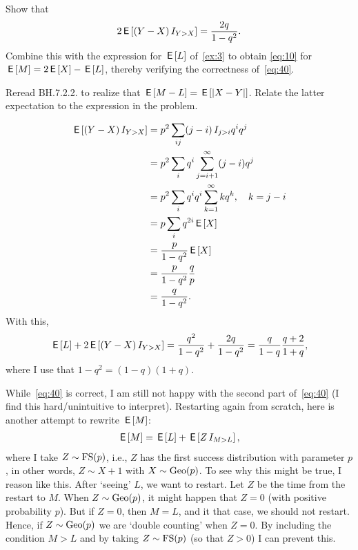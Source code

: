\documentclass[a4paper,11pt]{article}
\begin{document}
\begin{exercise}\label{ex:9}
Show that 
\begin{equation}
  \label{eq:41}
2\,\mathsf{E}\left[(Y-X) \,I_{Y>X}\right] = \frac{2q} {1-q^{2}}.
\end{equation}
Combine this with the expression for $\,\mathsf{E}\left[L\right]$ of~\cref{ex:3} to obtain \cref{eq:10} for $\,\mathsf{E}\left[M\right] = 2\,\mathsf{E}\left[X\right] - \,\mathsf{E}\left[L\right]$, thereby verifying the correctness of~\cref{eq:40}. 
\begin{hint}
  Reread BH.7.2.2. to realize that $\,\mathsf{E}\left[M-L\right] = \,\mathsf{E}\left[|X-Y|\right]$. Relate the latter expectation to the expression in the problem. 
\end{hint}
\begin{solution}
  \begin{align}
    \label{eq:42}
\,\mathsf{E}\left[(Y-X) \,I_{Y>X}\right] 
&= p^2\sum_{ij} (j-i)\,I_{j>i} q^iq^j\\
&= p^2\sum_{i} q^i\sum_{j=i+1}^{\infty}(j-i)q^j\\
&= p^2\sum_{i} q^i q^{i}\sum_{k=1}^{\infty}kq^k, \quad k = j-i\\
&= p\sum_{i}  q^{2i}\,\mathsf{E}\left[X\right] \\
&= \frac{p}{1-q^{2}}\,\mathsf{E}\left[X\right] \\
&= \frac{p}{1-q^{2}}\frac q p \\
&= \frac{q}{1-q^{2}}.
  \end{align}
With this, 
\begin{align}
  \label{eq:43}
\,\mathsf{E}\left[L\right] + 2  \,\mathsf{E}\left[(Y-X) \,I_{Y>X}\right] = \frac{q^{2}}{1-q^2} +  \frac{2q}{1-q^{2}} = \frac q{1-q}\frac{q+2}{1+q},
\end{align}
where I use that $1-q^{2}=(1-q)(1+q)$.
\end{solution}
\end{exercise}

While~\cref{eq:40} is correct, I am still not happy with the second part of~\eqref{eq:40} (I find this hard/unintuitive to interpret).
Restarting again from scratch, here is another attempt to rewrite $\,\mathsf{E}\left[M\right]$: 
\begin{align}
  \label{eq:44}
\,\mathsf{E}\left[M\right] = \,\mathsf{E}\left[L\right] + \,\mathsf{E}\left[ Z \,I_{M>L}\right],
\end{align}
where I take $Z\sim \mathrm{FS}(p)$, i.e., $Z$ has the first success distribution with parameter $p$, in other words, $Z \sim X+1$ with $X\sim\mathrm{Geo}(p)$.
To see why this might be true, I reason like this.
After `seeing' $L$, we want to restart.
Let $Z$ be the time from the restart to $M$.
When $Z\sim \mathrm{Geo}(p)$, it might happen that $Z=0$ (with positive probability $p$).
But if $Z=0$, then $M=L$, and it that case, we should not restart.
Hence, if $Z\sim \mathrm{Geo}(p)$ we are `double counting' when $Z=0$.
By including the condition $M>L$ and by taking $Z\sim\mathrm{FS}(p)$ (so that $Z>0$) I can prevent this.
\end{document}

